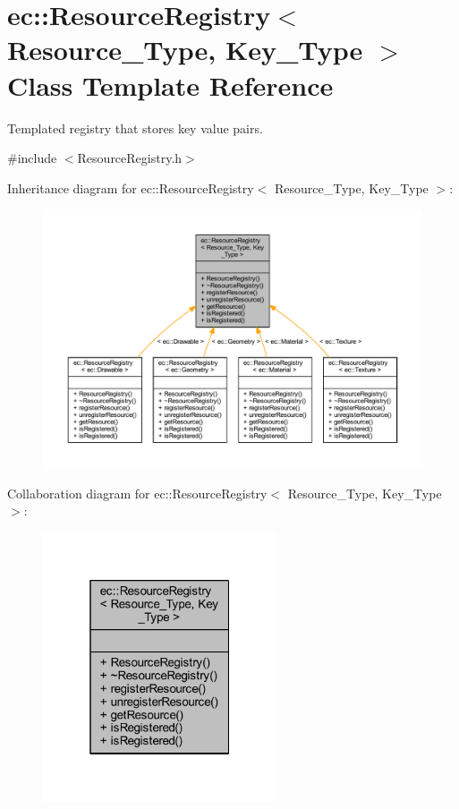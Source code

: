 \hypertarget{classec_1_1_resource_registry}{}\section{ec\+:\+:Resource\+Registry$<$ Resource\+\_\+\+Type, Key\+\_\+\+Type $>$ Class Template Reference}
\label{classec_1_1_resource_registry}


Templated registry that stores key value pairs.  




{\ttfamily \#include $<$Resource\+Registry.\+h$>$}



Inheritance diagram for ec\+:\+:Resource\+Registry$<$ Resource\+\_\+\+Type, Key\+\_\+\+Type $>$\+:\nopagebreak
\begin{figure}[H]
\begin{center}
\leavevmode
\includegraphics[width=350pt]{classec_1_1_resource_registry__inherit__graph}
\end{center}
\end{figure}


Collaboration diagram for ec\+:\+:Resource\+Registry$<$ Resource\+\_\+\+Type, Key\+\_\+\+Type $>$\+:\nopagebreak
\begin{figure}[H]
\begin{center}
\leavevmode
\includegraphics[width=196pt]{classec_1_1_resource_registry__coll__graph}
\end{center}
\end{figure}
